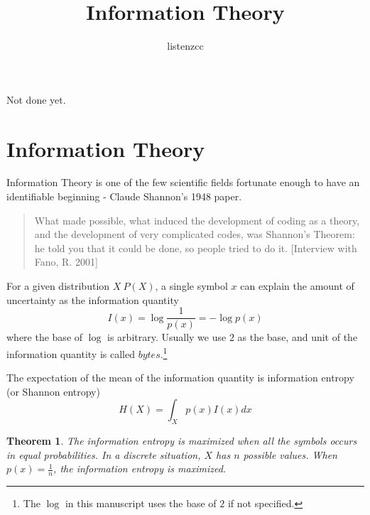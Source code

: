 \documentclass[a4paper]{article}
\title{Information Theory}
\author{listenzcc}
\newtheorem{theorem}{Theorem}[section]
\begin{document}
\maketitle


\abstract
Not done yet.

\tableofcontents

\section{Information Theory}
Information Theory is one of the few scientific fields fortunate enough to have an identifiable beginning - Claude Shannon's 1948 paper.
\begin{quote}
    What made possible, what induced the development of coding as a theory, and
    the development of very complicated codes, was Shannon's Theorem: he told
    you that it could be done, so people tried to do it.
        [Interview with Fano, R. 2001]
\end{quote}

For a given distribution $X ~ P(X)$, a single symbol $x$ can explain the amount of uncertainty as the information quantity
\begin{equation}
    I(x) = \log{\frac{1}{p(x)}} = - \log{p(x)}
    \label{eq: Information Quantity x}
\end{equation}
where the base of $\log{}$ is arbitrary. Usually we use $2$ as the base, and unit of the information quantity is called $bytes$.\footnote{The $\log{}$ in this manuscript uses the base of $2$ if not specified.}

The expectation of the mean of the information quantity is information entropy (or Shannon entropy)
\begin{equation}
    H(X) = \int_{X} p(x) I(x) dx
    \label{eq: Information Entropy X}
\end{equation}

\begin{theorem}
    The information entropy is maximized when all the symbols occurs in equal probabilities.
    In a discrete situation, $X$ has $n$ possible values. When $p(x) = \frac{1}{n}$, the information entropy is maximized.
\end{theorem}
\end{document}
